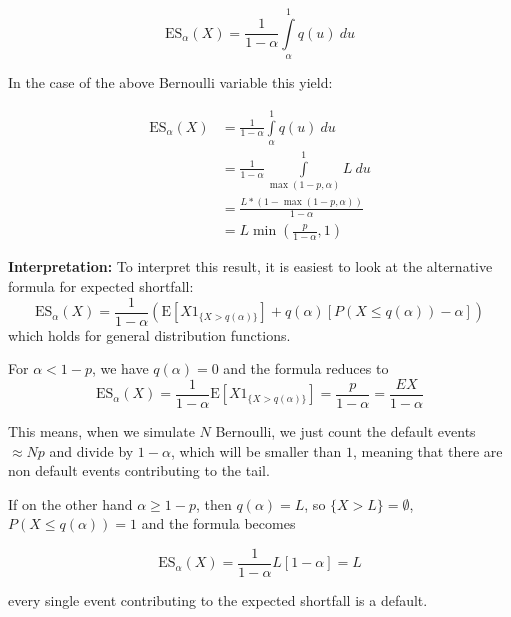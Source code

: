 \documentclass[11pt]{article}
\begin{document}
\begin{equation}
    \text{ES}_\alpha (X) = \frac{1}{1-\alpha}\int\limits_\alpha ^1 q(u)~du
\end{equation}

In the case of the above Bernoulli variable this yield:

\begin{align*}
    \text{ES}_\alpha (X) & = \frac{1}{1-\alpha}\int\limits_\alpha ^1 q(u)~du 
    \\&= \frac{1}{1-\alpha}\int\limits_{\max(1-p,\alpha)} ^1 L~du  
    \\ &= \frac{L * \left(1-\max(1-p,\alpha)\right)}{1-\alpha} 
    \\&= L \min\left(\frac{p}{1-\alpha},1\right) 
\end{align*}

\textbf{Interpretation:} 
To interpret this result, it is easiest to look at the alternative formula for expected shortfall:
\begin{equation}
    \text{ES}_\alpha (X) = \frac{1}{1-\alpha}\left(\text{E}\left[X 1_{\{X> q(\alpha)\}}\right] + q(\alpha)\left[P(X\leq q(\alpha))-\alpha\right]\right)
\end{equation}
which holds for general distribution functions.

For \(\alpha<1-p\), we have \(q(\alpha)=0\) and the formula reduces to
\begin{equation*}
    \text{ES}_\alpha (X) = \frac{1}{1-\alpha}\text{E}\left[X 1_{\{X> q(\alpha)\}}\right]=\frac{p}{1-\alpha}=\frac{EX}{1-\alpha}
\end{equation*}

This means, when we simulate \(N\) Bernoulli, we just count the default events \(\approx Np\) and divide by \(1-\alpha\), 
which will be smaller than \(1\), meaning that there are non default events contributing to the tail.

If on the other hand \(\alpha \geq 1-p\), then \(q(\alpha)=L\), so \(\{X>L\}=\emptyset\), \(P(X\leq q(\alpha))=1\) and the formula becomes

\begin{equation*}
    \text{ES}_\alpha (X) = \frac{1}{1-\alpha}L\left[1-\alpha\right]=L
\end{equation*}

every single event contributing to the expected shortfall is a default.
\end{document}
